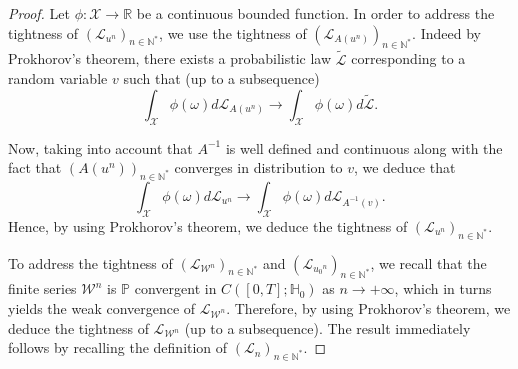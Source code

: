 \documentclass[10pt,a4paper]{amsart}
\begin{document}
\begin{proof}
	
	\noindent
	Let $\phi : \mathscr{X} \rightarrow \mathbb{R}$ be a continuous bounded function.  In order to address the tightness of $\left(\mathscr{L}_{u^n}\right)_{n \in \mathbb{N}^*}$, we use the tightness of $\left(\mathscr{L}_{A(u^n)}\right)_{n \in \mathbb{N}^*}$. Indeed by Prokhorov's theorem, there exists a probabilistic law $\tilde{\mathscr{L}}$ corresponding to a random variable $v$ such that (up to a subsequence) 
	$$
	\int_{\mathscr{X}} \phi(\omega) d\mathscr{L}_{A(u^n)} \rightarrow \int_{\mathscr{X}} \phi(\omega) d\tilde{\mathscr{L}}.
	$$
	
	\noindent
	Now, taking into account that $A^{-1}$ is well defined and continuous along with the fact that $(A(u^n))_{n \in \mathbb{N}^*}$ converges in distribution to $v$, we deduce that 
	$$
	\int_{\mathscr{X}} \phi(\omega) d\mathscr{L}_{u^n} \rightarrow \int_{\mathscr{X}} \phi(\omega) d{\mathscr{L}_{A^{-1}(v)}}.
	$$
	\noindent
	Hence, by using Prokhorov's theorem, we deduce the tightness of $\left(\mathscr{L}_{u^n}\right)_{n \in \mathbb{N}^*}$.
	
	\noindent 
	To address the tightness of $\left(\mathcal{L}_{{\mathcal{W}}^n}\right)_{n \in \mathbb{N}^*}$ and $\left(\mathcal{L}_{{u_0}^n}\right)_{n \in \mathbb{N}^*}$, we recall that the finite series $\mathcal{W}^n$ is $\mathbb{P}$ convergent in $C([0,T];\mathbb{H}_0)$ as $n\rightarrow +\infty$, which in turns yields the weak convergence of $\mathscr{L}_{\mathcal{W}^n}$. Therefore, by using Prokhorov's theorem, we deduce the tightness of $\mathscr{L}_{\mathcal{W}^n}$ (up to a subsequence). The result immediately follows by recalling the definition of $\left(\mathscr{L}_n\right)_{n \in \mathbb{N}^*}$.
\end{proof}
\end{document}

